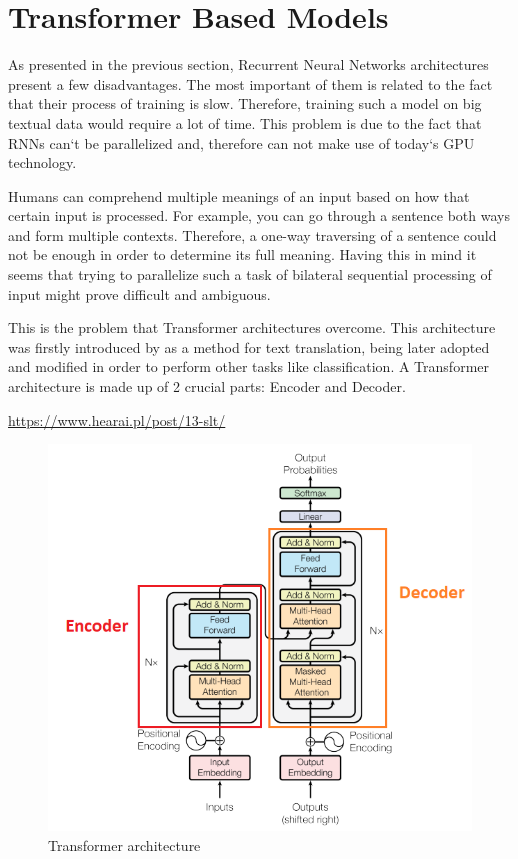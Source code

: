 \documentclass[12pt,a4paper]{report}
\begin{document}
\section{Transformer Based Models}

As presented in the previous section, Recurrent Neural Networks architectures present a few disadvantages. The most important of them is related to the fact that their process of training is slow. Therefore, training such a model on big textual data would require a lot of time. This problem is due to the fact that RNNs can`t be parallelized and, therefore can not make use of today`s GPU technology.

Humans can comprehend multiple meanings of an input based on how that certain input is processed. For example, you can go through a sentence both ways and form multiple contexts. Therefore, a one-way traversing of a sentence could not be enough in order to determine its full meaning. Having this in mind it seems that trying to parallelize such a task of bilateral sequential processing of input might prove difficult and ambiguous.


This is the problem that Transformer architectures overcome. This architecture was firstly introduced by \citet{NIPS2017_3f5ee243} as a method for text translation, being later adopted and modified in order to perform other tasks like classification.
A Transformer architecture is made up of 2 crucial parts: Encoder and Decoder.

\urldef{\urlTransformer}\url{https://www.hearai.pl/post/13-slt/}
\begin{figure}[H]
\centering
\includegraphics[width=12cm]{pics/transformer.png}
  \caption[Transformer architecture]{Transformer architecture \footnotemark}
  \label{fig:transformer}
\end{figure}
\footnotetext{\urlTransformer}
\end{document}
